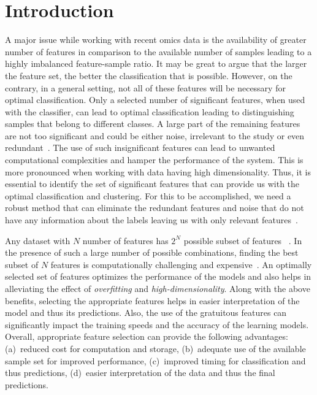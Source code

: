 \documentclass{bioinfo}
\begin{document}
\maketitle
\section{Introduction} \label{intro}
A major issue while working with recent omics data is the availability of greater number of features in comparison to the available number of samples leading to a highly imbalanced feature-sample ratio. 
It may be great to argue that the larger the feature set, the better the classification that is possible. 
However, on the contrary, in a general setting, not all of these features will be necessary for optimal classification. 
Only a selected number of significant features, when used with the classifier, can lead to optimal classification leading to distinguishing samples that belong to different classes. 
A large part of the remaining features are not too significant and could be either noise, irrelevant to the study or even redundant~\citep{pirgazi2019efficient}. 
The use of such insignificant features can lead to unwanted computational complexities and hamper the performance of the system. 
This is more pronounced when working with data having high dimensionality. 
Thus, it is essential to identify the set of significant features that can provide us with the optimal classification and clustering. 
For this to be accomplished, we need a robust method that can eliminate the redundant features and noise that do not have any information about the labels leaving us with only relevant features~\citep{liu2012feature}. 

Any dataset with $N$ number of features has $2^N$ possible subset of features ~\citep{pirgazi2019efficient}. 
In the presence of such a large number of possible combinations, finding the best subset of $N$ features is computationally challenging and expensive~\citep{liang2018review}.
An optimally selected set of features optimizes the performance of the models and also helps in alleviating the effect of \emph{overfitting} and \emph{high-dimensionality}. 
Along with the above benefits, selecting the appropriate features helps in easier interpretation of the model and thus its predictions. 
Also, the use of the gratuitous features can significantly impact the training speeds and the accuracy of the learning models. 
Overall, appropriate feature selection can provide the following advantages: (a)~reduced cost for computation and storage, (b)~adequate use of the available sample set for improved performance, (c)~improved timing for classification and thus predictions, (d)~easier interpretation of the data and thus the final predictions.
\end{document}
